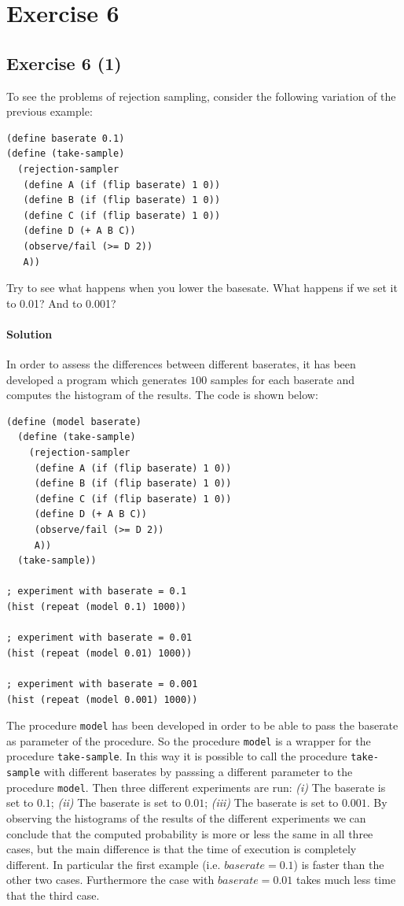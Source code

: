\section*{Exercise 6}

\subsection*{Exercise 6 (1)}
To see the problems of rejection sampling, consider the following variation of the previous example:

\begin{lstlisting}
(define baserate 0.1)
(define (take-sample)
  (rejection-sampler
   (define A (if (flip baserate) 1 0))
   (define B (if (flip baserate) 1 0))
   (define C (if (flip baserate) 1 0))
   (define D (+ A B C))
   (observe/fail (>= D 2))
   A))
\end{lstlisting}

Try to see what happens when you lower the basesate. What happens if we set it to 0.01? And to 0.001?

\paragraph{Solution}
In order to assess the differences between different baserates, it has been developed a program which generates $100$ samples for each
baserate and computes the histogram of the results. The code is shown below:
\begin{lstlisting}
(define (model baserate)
  (define (take-sample)
    (rejection-sampler
     (define A (if (flip baserate) 1 0))
     (define B (if (flip baserate) 1 0))
     (define C (if (flip baserate) 1 0))
     (define D (+ A B C))
     (observe/fail (>= D 2))
     A))
  (take-sample))

; experiment with baserate = 0.1
(hist (repeat (model 0.1) 1000))

; experiment with baserate = 0.01
(hist (repeat (model 0.01) 1000))

; experiment with baserate = 0.001
(hist (repeat (model 0.001) 1000))
\end{lstlisting}

The procedure \texttt{model} has been developed in order to be able to pass the baserate as parameter of the procedure. So the 
procedure \texttt{model} is a wrapper for the procedure \texttt{take-sample}. In this way it is possible to call the procedure 
\texttt{take-sample} with different baserates by passsing a different parameter to the procedure \texttt{model}.
Then three different experiments are run: \textit{(i)} The baserate is set to $0.1$; \textit{(ii)} The baserate is set to $0.01$;
\textit{(iii)} The baserate is set to $0.001$.
By observing the histograms of the results of the different experiments we can conclude that the computed probability is more or less
the same in all three cases, but the main difference is that the time of execution is completely different.
In particular the first example (i.e. $baserate = 0.1$) is faster than the other two cases. 
Furthermore the case with $baserate = 0.01$ takes much less time that the third case.

